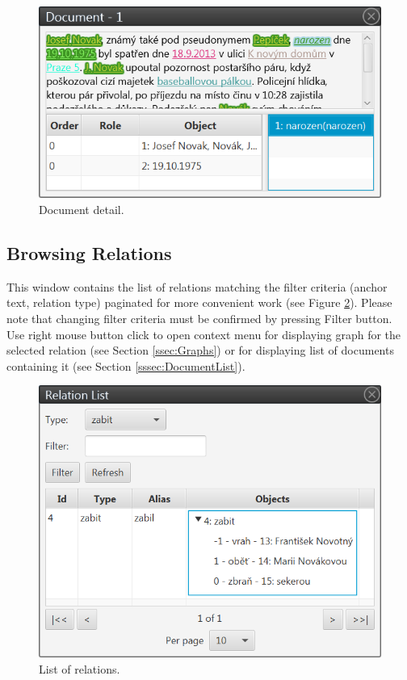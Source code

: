 \begin{figure}[!htb]
        \centering
        \includegraphics[width=\textwidth]{Images/documentview}
        \caption{Document detail.}
        \label{fig:DocumentView}
\end{figure}

\subsection{Browsing Relations}

This window contains the list of relations matching the filter criteria (anchor
text, relation type) paginated for more convenient work (see Figure
\ref{fig:RelationList}). Please note that changing filter criteria must be
confirmed by pressing Filter button. Use right mouse button click to open
context menu for displaying graph for the selected relation (see Section
\ref{ssec:Graphs}) or for displaying list of documents containing it (see
Section \ref{sssec:DocumentList}).

\begin{figure}[!htb]
        \centering
        \includegraphics[width=\textwidth]{Images/relationlist}
        \caption{List of relations.}
        \label{fig:RelationList}
\end{figure}

